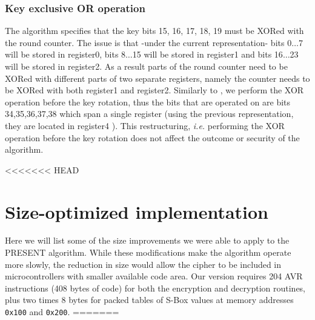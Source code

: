 \documentclass[11pt]{article}
\begin{document}
\subsubsection{Key exclusive OR operation}
The algorithm specifies that the key bits 15, 16, 17, 18, 19 must be XORed with the round counter. The issue is that -under the current representation- bits 0$\dots$7 will be stored in register0, bits 8$\dots$15 will be stored in register1 and bits 16$\dots$23 will be stored in register2. As a result parts of the round counter need to be XORed with different parts of two separate registers, namely the counter needs to be XORed with both register1 and register2. Similarly to \cite{eisenbarth2012compact}, we perform the XOR operation before the key rotation, thus the bits that are operated on are bits 34,35,36,37,38 which span a single register (using the previous representation, they are located in register4 ). This restructuring, \emph{i.e.} performing the XOR operation before the key rotation does not affect the outcome or security of the algorithm. 



<<<<<<< HEAD
\section{Size-optimized implementation}

Here we will list some of the size improvements we were able to apply to the PRESENT algorithm.
While these modifications make the algorithm operate more slowly, the reduction in size would allow the cipher to be included in microcontrollers with smaller available code area.
Our version requires 204 AVR instructions (408 bytes of code) for both the encryption and decryption routines, plus two times 8 bytes for packed tables of S-Box values at memory addresses \texttt{0x100} and \texttt{0x200}.
=======
\end{document}
